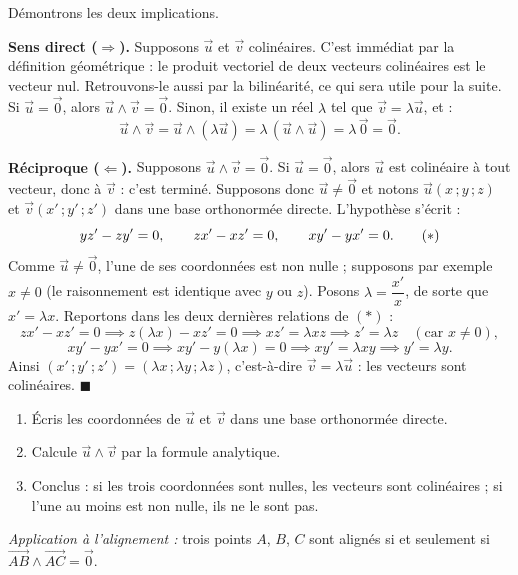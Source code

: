 \documentclass[11pt]{article}
\def\star{\mathbin{\ast}}\def\bigstar{\mathord{\ast}}%
\begin{document}
\begin{experience}
Démontrons les deux implications.

\textbf{Sens direct ($\Rightarrow$).} Supposons $\vec{u}$ et $\vec{v}$ colinéaires. C'est immédiat par la définition géométrique : le produit vectoriel de deux vecteurs colinéaires est le vecteur nul. Retrouvons-le aussi par la bilinéarité, ce qui sera utile pour la suite. Si $\vec{u}=\vec{0}$, alors $\vec{u}\wedge\vec{v}=\vec{0}$. Sinon, il existe un réel $\lambda$ tel que $\vec{v}=\lambda\vec{u}$, et :
\[
\vec{u}\wedge\vec{v}=\vec{u}\wedge(\lambda\vec{u})=\lambda\,(\vec{u}\wedge\vec{u})=\lambda\,\vec{0}=\vec{0}.
\]

\textbf{Réciproque ($\Leftarrow$).} Supposons $\vec{u}\wedge\vec{v}=\vec{0}$. Si $\vec{u}=\vec{0}$, alors $\vec{u}$ est colinéaire à tout vecteur, donc à $\vec{v}$ : c'est terminé. Supposons donc $\vec{u}\neq\vec{0}$ et notons $\vec{u}(x\,;y\,;z)$ et $\vec{v}(x'\,;y'\,;z')$ dans une base orthonormée directe. L'hypothèse s'écrit :
\[
yz'-zy'=0,\qquad zx'-xz'=0,\qquad xy'-yx'=0. \tag{$\star$}
\]
Comme $\vec{u}\neq\vec{0}$, l'une de ses coordonnées est non nulle ; supposons par exemple $x\neq0$ (le raisonnement est identique avec $y$ ou $z$). Posons $\lambda=\dfrac{x'}{x}$, de sorte que $x'=\lambda x$. Reportons dans les deux dernières relations de $(\star)$ :
\[
zx'-xz'=0 \implies z(\lambda x)-xz'=0 \implies xz'=\lambda xz \implies z'=\lambda z
\quad(\text{car }x\neq0),
\]
\[
xy'-yx'=0 \implies xy'-y(\lambda x)=0 \implies xy'=\lambda xy \implies y'=\lambda y.
\]
Ainsi $(x'\,;y'\,;z')=(\lambda x\,;\lambda y\,;\lambda z)$, c'est-à-dire $\vec{v}=\lambda\vec{u}$ : les vecteurs sont colinéaires. $\blacksquare$
\end{experience}

\begin{methode}
\begin{enumerate}
\item Écris les coordonnées de $\vec{u}$ et $\vec{v}$ dans une base orthonormée directe.
\item Calcule $\vec{u}\wedge\vec{v}$ par la formule analytique.
\item Conclus : si les trois coordonnées sont nulles, les vecteurs sont colinéaires ; si l'une au moins est non nulle, ils ne le sont pas.
\end{enumerate}
\emph{Application à l'alignement :} trois points $A$, $B$, $C$ sont alignés si et seulement si $\overrightarrow{AB}\wedge\overrightarrow{AC}=\vec{0}$.
\end{methode}
\end{document}
